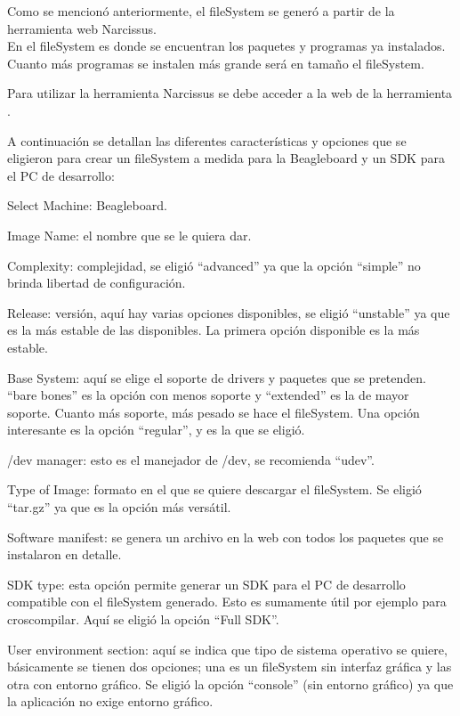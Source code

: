 Como se mencionó anteriormente, el fileSystem se generó a partir de la herramienta web Narcissus.\\
En el fileSystem es donde se encuentran los paquetes y programas ya instalados. Cuanto más programas se instalen más grande será en tamaño el fileSystem.

\bigskip
Para utilizar la herramienta Narcissus se debe acceder a la web de la herramienta \cite{Narc}.

\bigskip
A continuación se detallan las diferentes características y opciones que se eligieron para crear un fileSystem a medida para la Beagleboard y un SDK para el PC de desarrollo:

\bigskip
Select Machine: Beagleboard.

\bigskip
Image Name: el nombre que se le quiera dar.

\bigskip
Complexity: complejidad, se eligió “advanced” ya que la opción “simple” no brinda libertad de configuración.

\bigskip
Release: versión, aquí hay varias opciones disponibles, se eligió “unstable” ya que es la más estable de las disponibles. La primera opción disponible es la más estable.

\bigskip
Base System: aquí se elige el soporte de drivers y paquetes que se pretenden. “bare bones” es la opción con menos soporte y “extended” es la de mayor soporte. Cuanto más soporte, más pesado se hace el fileSystem. Una opción interesante es la opción “regular”, y es la que se eligió.

\bigskip
/dev manager: esto es el manejador de /dev, se recomienda “udev”.

\bigskip
Type of Image: formato en el que se quiere descargar el fileSystem. Se eligió “tar.gz” ya que es la opción más versátil.

\bigskip
Software manifest: se genera un archivo en la web con todos los paquetes que se instalaron en detalle.

\bigskip
SDK type: esta opción permite generar un SDK para el PC de desarrollo compatible con el fileSystem generado. Esto es sumamente útil por ejemplo para croscompilar. Aquí se eligió la opción “Full SDK”.

\bigskip
User environment section: aquí se indica que tipo de sistema operativo se quiere, básicamente se tienen dos opciones; una es un fileSystem sin interfaz gráfica y las otra con entorno gráfico. Se eligió la opción “console” (sin entorno gráfico) ya que la aplicación no exige entorno gráfico.

